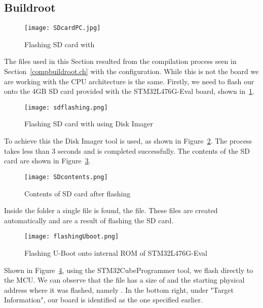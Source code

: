 \subsection{Buildroot}

\begin{figure}[H]
\centering
\texttt{[image: SDcardPC.jpg]}
\caption{Flashing SD card with }
\label{SDcardPC}
\end{figure}

The files used in this Section resulted from the compilation process seen in Section~\ref{compbuildroot.ch} with the  configuration. While this is not the board we are working with the CPU architecture is the same.
Firstly, we need to flash our  onto the 4GB SD card provided with the STM32L476G-Eval board, shown in~\ref{SDcardPC}.

\begin{figure}[H]
\centering
\texttt{[image: sdflashing.png]}
\caption{Flashing SD card with  using Disk Imager}
\label{sdflashing}
\end{figure}

To achieve this the Disk Imager tool is used, as shown in Figure~\ref{sdflashing}. The process takes less than 3 seconds and is completed successfully. The contents of the SD card are shown in Figure~\ref{SDcontents}.

\begin{figure}[H]
\centering
\texttt{[image: SDcontents.png]}
\caption{Contents of SD card after flashing}
\label{SDcontents}
\end{figure}

Inside the  folder a single file is found, the  file. These files are created automatically and are a result of flashing the SD card.

\begin{figure}[H]
\centering
\texttt{[image: flashingUboot.png]}
\caption{Flashing U-Boot onto internal ROM of STM32L476G-Eval}
\label{flashingUboot}
\end{figure}

Shown in Figure~\ref{flashingUboot}, using the STM32CubeProgrammer tool, we flash  directly to the MCU. We can observe that the file has a size of  and the starting physical address where it was flashed, namely . In the bottom right, under "Target Information", our board is identified as the one specified earlier.

